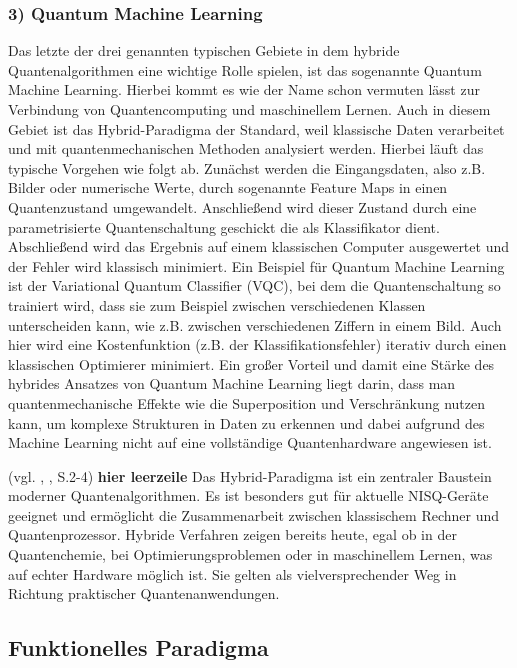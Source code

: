 \subsubsection*{3) Quantum Machine Learning}
Das letzte der drei genannten typischen Gebiete in dem hybride Quantenalgorithmen eine wichtige Rolle spielen, ist das sogenannte Quantum Machine Learning. Hierbei kommt es wie der Name schon vermuten lässt zur Verbindung von Quantencomputing und maschinellem Lernen. Auch in diesem Gebiet ist das Hybrid-Paradigma der Standard, weil klassische Daten verarbeitet und mit quantenmechanischen Methoden analysiert werden. 
Hierbei läuft das typische Vorgehen wie folgt ab. Zunächst werden die Eingangsdaten, also z.B. Bilder oder numerische Werte, durch sogenannte Feature Maps in einen Quantenzustand umgewandelt. Anschließend wird dieser Zustand durch eine parametrisierte Quantenschaltung geschickt die als Klassifikator dient. Abschließend wird das Ergebnis auf einem klassischen Computer ausgewertet und der Fehler wird klassisch minimiert. 
Ein Beispiel für Quantum Machine Learning ist der Variational Quantum Classifier (VQC), bei dem die Quantenschaltung so trainiert wird, dass sie zum Beispiel zwischen verschiedenen Klassen unterscheiden kann, wie z.B. zwischen verschiedenen Ziffern in einem Bild. Auch hier wird eine Kostenfunktion (z.B. der Klassifikationsfehler) iterativ durch einen klassischen Optimierer minimiert. 
Ein großer Vorteil und damit eine Stärke des hybrides Ansatzes von Quantum Machine Learning liegt darin, dass man quantenmechanische Effekte wie die Superposition und Verschränkung nutzen kann, um komplexe Strukturen in Daten zu erkennen und dabei aufgrund des Machine Learning nicht auf eine vollständige Quantenhardware angewiesen ist.

(vgl. \citeauthor{alchieri_introduction_2021}, \citeyear{alchieri_introduction_2021}, S.2-4)
\textbf{hier leerzeile}
Das Hybrid-Paradigma ist ein zentraler Baustein moderner Quantenalgorithmen. Es ist besonders gut für aktuelle NISQ-Geräte geeignet und ermöglicht die Zusammenarbeit zwischen klassischem Rechner und Quantenprozessor. Hybride Verfahren zeigen bereits heute, egal ob in der Quantenchemie, bei Optimierungsproblemen oder in maschinellem Lernen, was auf echter Hardware möglich ist. Sie gelten als vielversprechender Weg in Richtung praktischer Quantenanwendungen. 

\subsection{Funktionelles Paradigma}

